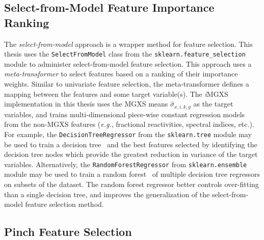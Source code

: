\subsection{Select-from-Model Feature Importance Ranking}
\label{subsec:chap10-select-from-model}

The \textit{select-from-model} approach is a wrapper method for feature selection. This thesis uses the \texttt{SelectFromModel} class from the \texttt{sklearn.feature_selection} module to administer select-from-model feature selection. This approach uses a \textit{meta-transformer} to select features based on a ranking of their importance weights. Similar to univariate feature selection, the meta-transformer defines a mapping between the features and some target variable(s). The \textit{i}\ac{MGXS} implementation in this thesis uses the \ac{MGXS} means $\hat{\sigma}_{x,i,k,g}$ as the target variables, and trains multi-dimensional piece-wise constant regression models from the non-\ac{MGXS} features (\textit{e.g.}, fractional reactivities, spectral indices, etc.). For example, the \texttt{DecisionTreeRegressor} from the \texttt{sklearn.tree} module may be used to train a decision tree~\cite{breiman1984tree} and the best features selected by identifying the decision tree nodes which provide the greatest reduction in variance of the target variables. Alternatively, the \texttt{RandomForestRegressor} from \texttt{sklearn.ensemble} module may be used to train a random forest~\cite{ho1998forest} of multiple decision tree regressors on subsets of the dataset. The random forest regressor better controls over-fitting than a single decision tree, and improves the generalization of the select-from-model feature selection method.

\subsection{Pinch Feature Selection}
\label{subsec:chap10-pinch-selection}

